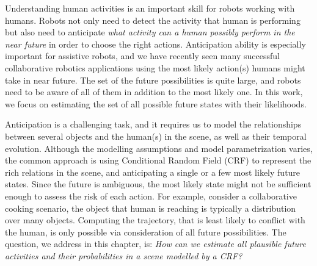 \label{intro}
Understanding  human activities is an important skill for robots working with humans. Robots not only need to detect the activity that human is performing but also need to anticipate \emph{what activity can a human possibly perform in the near future} in order to choose the right actions. Anticipation ability is especially important for assistive robots, and we have recently seen many successful collaborative robotics applications \cite{collob1,collob2,hemaISER} using the most likely action(s) humans might take in near future.
The set of the future possibilities is quite large, and robots need to be aware of all of them in addition to the most likely one. In this work, we focus on estimating the set of all possible future states with their likelihoods.


Anticipation is a challenging task, and it requires us to model the relationships between several objects and the human(s) in the scene, as well as their temporal evolution. Although the modelling assumptions and model parametrization varies, the common approach \cite{hemaAnt,gpcrf,hemaECCV,tian} is using Conditional Random Field (CRF) to represent the rich relations in the scene, and anticipating a single or a few most likely future states. Since the future is ambiguous, the most likely state might not be sufficient enough to assess the risk of each action. For example, consider a collaborative cooking scenario, the object that human is reaching is typically a distribution over many objects. Computing the trajectory, that is least likely to conflict with the human, is only possible via consideration of all future possibilities. The question, we address in this chapter, is: \emph{How can we estimate all plausible future activities and their probabilities in a scene modelled by a CRF?}



